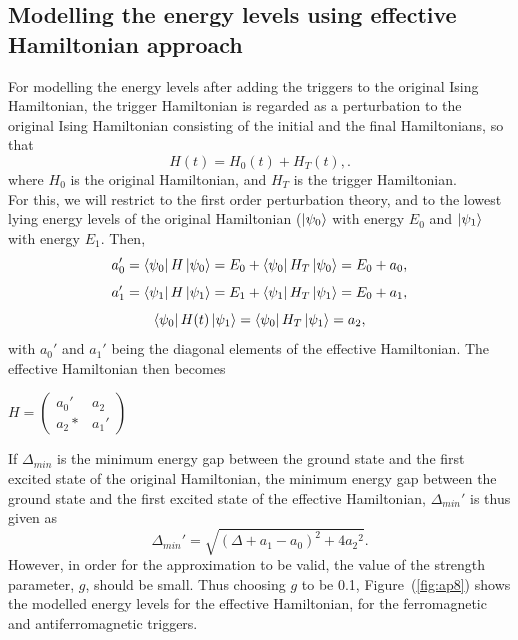 \documentclass[../main.tex]{subfiles}
\begin{document}
\begin{appendices}
\section{Modelling the energy levels using effective Hamiltonian approach}
For modelling the energy levels after adding the triggers to the original Ising Hamiltonian, the trigger Hamiltonian is regarded as a perturbation to the original Ising Hamiltonian consisting of the initial and the final Hamiltonians, so that 
\begin{equation}
H(t)=H_0(t)+H_T(t),.
\end{equation}
where $H_0$ is the original Hamiltonian, and $H_T$ is the trigger Hamiltonian.\\
For this, we will restrict to the first order perturbation theory, and to the lowest lying energy levels of the original Hamiltonian ($\ket{\psi_0}$ with energy $E_0$ and $\ket{\psi_1}$ with energy $E_1$. Then,
\begin{equation}
a_0'=\bra{\psi_0}H\ket{\psi_0}=E_0+\bra{\psi_0}H_T \ket{\psi_0}=E_0+a_0,
\end{equation}
\begin{equation}
a_1'=\bra{\psi_1}H\ket{\psi_1}=E_1+\bra{\psi_1}H_T \ket{\psi_1}=E_0+a_1,
\end{equation}
\begin{equation}
\bra{\psi_0}H(t)\ket{\psi_1}=\bra{\psi_0}H_T \ket{\psi_1}=a_2,
\end{equation}
with $a_0'$ and $a_1'$ being the diagonal elements of the effective Hamiltonian. The effective Hamiltonian then becomes
\begin{center}
$ H= \begin{pmatrix}
a_0' & a_2\\
a_2* & a_1'
\end{pmatrix}$
\end{center}
If $\Delta_{min}$ is the minimum energy gap between the ground state and the first excited state of the original Hamiltonian, the minimum energy gap between the ground state and the first excited state of the effective Hamiltonian, $\Delta_{min}'$ is thus given as
\begin{equation}
\Delta_{min}'=\sqrt{{(\Delta+a_1-a_0)}^2+4{a_2}^2}.
\end{equation}
However, in order for the approximation to be valid, the value of the strength parameter, $g$, should be small. Thus choosing $g$ to be 0.1, Figure~(\ref{fig:ap8}) shows the modelled energy levels for the effective Hamiltonian, for the ferromagnetic and antiferromagnetic triggers.

\end{appendices}
\end{document}

